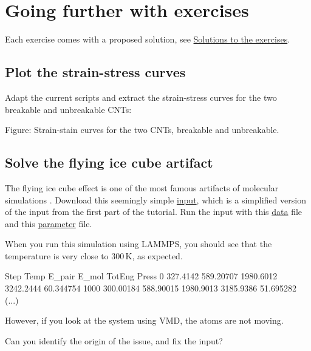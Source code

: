\section{Going further with exercises}
\noindent Each exercise comes with a proposed solution, 
see \hyperref[solutions-label]{Solutions to the exercises}.

\subsection{Plot the strain-stress curves}
\noindent Adapt the current scripts and extract the strain-stress curves for
the two breakable and unbreakable CNTs:

\vspace{0.25cm} Figure: Strain-stain curves for the two CNTs, breakable and unbreakable.

\subsection{Solve the flying ice cube artifact}
\noindent The flying ice cube effect is one of the most famous artifacts of
molecular simulations \cite{wong2016good}.
Download this seemingly simple \href{https://lammpstutorials.github.io/lammpstutorials-inputs/level1/breaking-a-carbon-nanotube/exercises/flying-ice-cube/input.lammps}{input}, which is a simplified
version of the input from the first part of the tutorial.
Run the input with this \href{https://lammpstutorials.github.io/lammpstutorials-inputs/level1/breaking-a-carbon-nanotube/exercises/flying-ice-cube/cnt_molecular.data}{data} file
and this \href{https://lammpstutorials.github.io/lammpstutorials-inputs/level1/breaking-a-carbon-nanotube/exercises/flying-ice-cube/parm.lammps}{parameter} file.

\vspace{0.25cm} \noindent When you run this simulation using LAMMPS, you should see that the temperature is
very close to $300\,\text{K}$, as expected.

\begin{lcverbatim}
Step   Temp        E_pair      E_mol       TotEng      Press     
0      327.4142    589.20707   1980.6012   3242.2444   60.344754    
1000   300.00184   588.90015   1980.9013   3185.9386   51.695282
(...)
\end{lcverbatim}

\noindent However, if you look at the system using VMD, the atoms are not moving.

\vspace{0.25cm} \noindent Can you identify the origin of the issue, and fix the input?

